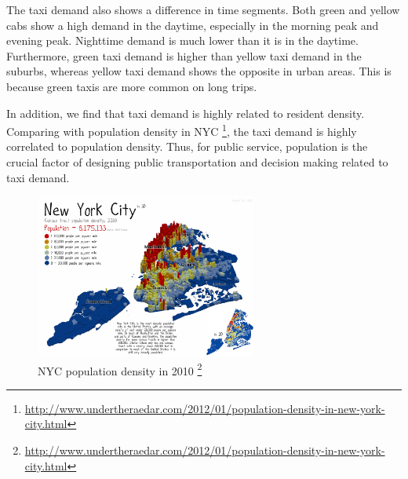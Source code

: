 \documentclass[11pt]{article}
\begin{document}
The taxi demand also shows a difference in time segments. Both green and yellow cabs show a high demand in the daytime, especially in the morning peak and evening peak. Nighttime demand is much lower than it is in the daytime. Furthermore, green taxi demand is higher than yellow taxi demand in the suburbs, whereas yellow taxi demand shows the opposite in urban areas. This is because green taxis are more common on long trips.

In addition, we find that taxi demand is highly related to resident density. Comparing with population density in NYC \footnote{\url{http://www.undertheraedar.com/2012/01/population-density-in-new-york-city.html}}, the taxi demand is highly correlated to population density. Thus, for public service, population is the crucial factor of designing public transportation and decision making related to taxi demand.

\begin{figure}[h]
\includegraphics[width=0.65\textwidth]{plots/nyc_popdens_labels_layout2.png}
\centering
\caption{NYC population density in 2010 \footnote{\url{http://www.undertheraedar.com/2012/01/population-density-in-new-york-city.html}}}
\label{Fig:yel_time}
\end{figure}



\clearpage

\printbibliography
\end{document}
